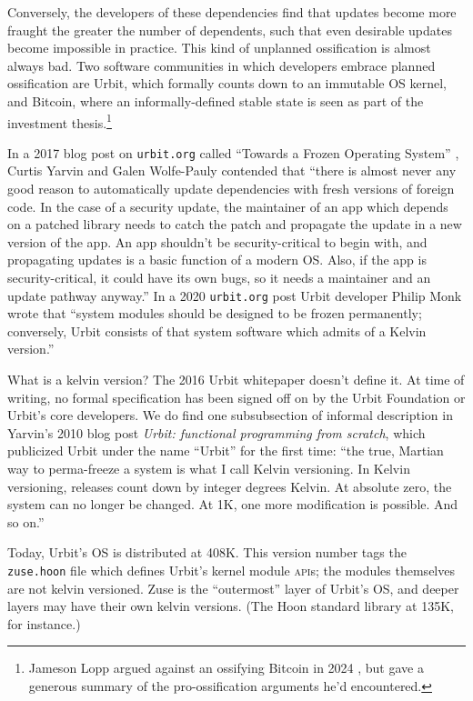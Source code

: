 \documentclass[twoside]{article}
\begin{document}
Conversely, the developers of these dependencies find that updates
become more fraught the greater the number of dependents, such that even
desirable updates become impossible in practice. This kind of unplanned
ossification is almost always bad. Two software communities in which
developers embrace planned ossification are Urbit, which formally counts
down to an immutable OS kernel, and Bitcoin, where an informally-defined
stable state is seen as part of the investment thesis.\footnote{Jameson Lopp
argued against an ossifying Bitcoin in 2024 \citep{Lopp2024}, but gave a
generous summary of the pro-ossification arguments he'd encountered.}

In a 2017 blog post on \texttt{urbit.org} called ``Towards a Frozen Operating
System'' \citep{YarvinWolfePauly2017}, Curtis Yarvin
and Galen Wolfe-Pauly contended that ``there is almost never any good
reason to automatically update dependencies with fresh versions of
foreign code. In the case of a security update, the maintainer of an app
which depends on a patched library needs to catch the patch and
propagate the update in a new version of the app. An app shouldn't be
security-critical to begin with, and propagating updates is a basic
function of a modern OS. Also, if the app is security-critical, it could
have its own bugs, so it needs a maintainer and an update pathway
anyway.'' In a 2020 \texttt{urbit.org} post \citep{Monk2020} Urbit developer
Philip Monk wrote that ``system modules should be designed to be frozen
permanently; conversely, Urbit consists of that system software which
admits of a Kelvin version.''

What is a kelvin version? The 2016 Urbit whitepaper \citep{Whitepaper} doesn't define
it. At time of writing, no formal specification has been signed off on
by the Urbit Foundation or Urbit's core developers. We do find one
subsubsection of informal description in Yarvin's 2010 blog post
\emph{Urbit: functional programming from scratch}, which publicized
Urbit under the name ``Urbit'' for the first time: ``the true, Martian
way to perma-freeze a system is what I call Kelvin versioning. In Kelvin
versioning, releases count down by integer degrees Kelvin. At absolute
zero, the system can no longer be changed. At 1K, one more modification
is possible. And so on.'' \citep{Yarvin2010}

Today, Urbit's OS is distributed at 408K. This version number tags the
\texttt{zuse.hoon} file which defines Urbit's kernel module \textsc{api}s; the
modules themselves are not kelvin versioned. Zuse is the ``outermost''
layer of Urbit's OS, and deeper layers may have their own kelvin
versions. (The Hoon standard library at 135K, for instance.)
\end{document}
